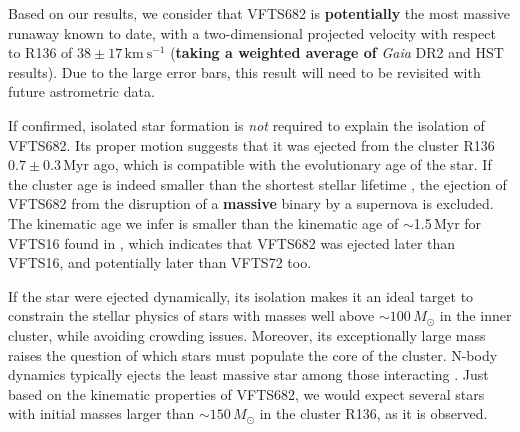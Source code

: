 \documentclass[a4paper,fleqn,usenatbib]{mnras}
\newcommand{\newtext}[1]{{\color{ForestGreen}\bf{#1}}}
\newcommand{\kms}{{\,\mathrm{km\ s^{-1}}}}
\begin{document}
Based on our results, we consider that VFTS682 is
\newtext{potentially} the most massive
runaway known to date, with a two-dimensional
projected velocity with respect to R136 of
$38\pm17\kms$ (\newtext{taking a weighted average of} \emph{Gaia} DR2 and HST
results). Due to the large error bars, this result will need
to be revisited with future astrometric data. %

If confirmed, %
isolated star formation is
\emph{not} required to explain the isolation of VFTS682. Its proper motion suggests that it was ejected from the cluster R136
$0.7\pm0.3$\,Myr ago, which is compatible with the evolutionary age of
the star. If the
cluster age \citep[$\lesssim2$\,Myr,][]{crowther:10, sabbi:12} is
indeed smaller than the shortest stellar lifetime
\citep[$\sim$3\,Myr,][]{brott:11,kohler:15, zapartas:17}, the ejection of VFTS682
from the disruption of a \newtext{massive} binary by a supernova is excluded. %
The kinematic age we infer is smaller than the kinematic age of
$\sim$1.5\,Myr for VFTS16 found in \cite{lennon:18}, which indicates
that VFTS682 was ejected later than VFTS16, and potentially later than
VFTS72 too.


If the star were ejected dynamically, its isolation makes it an ideal target to constrain the stellar physics of
stars with masses well above $\sim$$100\,M_\odot$ in the inner
cluster, while avoiding
crowding issues. Moreover, 
 its exceptionally large mass raises the question of which stars must populate
the core of the cluster. N-body dynamics typically ejects the least
massive star among those interacting \cite[\newtext{although the
  dynamical ejection fraction increases with mass because of mass
  segregation}, e.g.,][]{banerjee:12}. Just
based on the kinematic properties of VFTS682, we would expect several
stars with initial masses larger than $\sim$$150\,M_\odot$ in the
cluster R136, as it is observed.%
\end{document}
